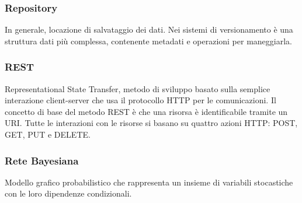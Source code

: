 \subsubsection*{Repository}
In generale, locazione di salvataggio dei dati. Nei sistemi di versionamento è una struttura dati più complessa, contenente metadati e operazioni per maneggiarla.

\subsubsection*{REST}
Representational State Transfer, metodo di sviluppo basato sulla semplice interazione client-server che usa il protocollo HTTP per le comunicazioni. Il concetto di base del metodo REST è che una risorsa è  identificabile tramite un URI. Tutte le interazioni con le risorse si basano su quattro azioni HTTP: POST, GET, PUT e DELETE.

\subsubsection*{Rete Bayesiana}
Modello grafico probabilistico che rappresenta un insieme di variabili stocastiche con le loro dipendenze condizionali.

